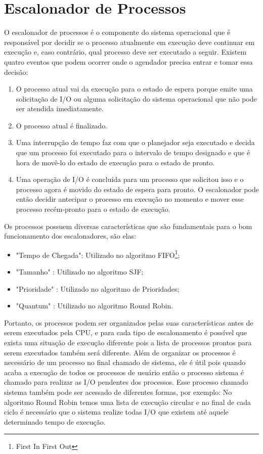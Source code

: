 \documentclass[times, 10pt,twocolumn]{article}
\begin{document}
\section{Escalonador de Processos} \label{sec_escalonador_proc}
O escalonador de processos é o componente do sistema operacional que é responsável por decidir se o processo atualmente em execução deve continuar em execução e, caso contrário, qual processo deve ser executado a seguir.\cite{rutgers} Existem quatro eventos que podem ocorrer onde o agendador precisa entrar e tomar essa decisão: 
\begin{enumerate}
\item O processo atual vai da execução para o estado de espera porque emite uma solicitação de I/O ou alguma solicitação do sistema operacional que não pode ser atendida imediatamente. 

\item O processo atual é finalizado.
\item Uma interrupção de tempo faz com que o planejador seja executado e decida que um processo foi executado para o intervalo de tempo designado e que é hora de movê-lo do estado de execução para o estado de pronto.
 
\item Uma operação de I/O é concluída para um processo que solicitou isso e o processo agora é movido do estado de espera para pronto. O escalonador pode então decidir antecipar o processo em execução no momento e mover esse processo recém-pronto para o estado de execução.  
\end{enumerate}
Os processos possuem diversas características que são fundamentais para o bom funcionamento dos escalonadores, são elas:  
\begin{itemize} 
\item "Tempo de Chegada": Utilizado no algoritmo FIFO\footnote{First In First Out};	
\item "Tamanho" : Utilizado no algoritmo SJF; 
\item "Prioridade" : Utilizado no algoritmo de Prioridades;  
\item "Quantum" : Utilizado no algoritmo Round Robin.
\end{itemize}
Portanto, os processos podem ser organizados pelas suas características antes de serem executados pela CPU, e para cada tipo de escalonamento é possível que exista uma situação de execução diferente pois a lista de processos prontos para serem executados também será diferente. Além de organizar os processos é necessário de um processo no final chamado de sistema, ele é útil pois quando acaba a execução de todos os processos de usuário então o processo sistema é chamado para realizar as I/O pendentes dos processos. Esse processo chamado sistema também pode ser acessado de diferentes formas, por exemplo: No algoritmo Round Robin temos uma lista de execução circular e no final de cada ciclo é necessário que o sistema realize todas I/O que existem até aquele determinado tempo de execução. \cite{tutorialspoint}
\end{document}
